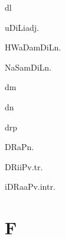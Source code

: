 \begin{multicols*}{2}
\begin{dictroot}{d}{l}
\begin{dictentry}{uDiLi}{adj.}
{        }
    \end{dictentry}

    \begin{dictentry}{HWaDamDiL}{n.}
    \end{dictentry}
    \begin{dictentry}{NaSamDiL}{n.}
    \end{dictentry}
\end{dictroot}

\begin{dictroot}{d}{m}
\end{dictroot}

\begin{dictroot}{d}{n}
\end{dictroot}

\begin{dictroot}{dr}{p}
    \begin{dictentry}{DRaP}{n.}
    \end{dictentry}
    \begin{dictentry}{DRiiP}{v.tr.}
    \end{dictentry}
    \begin{dictentry}{iDRaaP}{v.intr.}
    \end{dictentry}
\end{dictroot}

\section*{F}


\end{multicols*}
